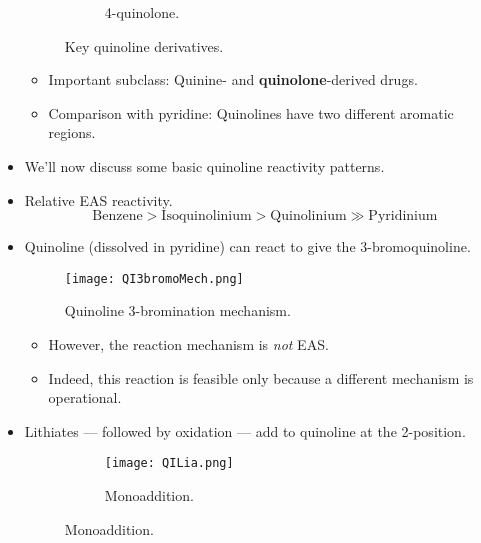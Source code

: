 \documentclass[../notes.tex]{subfiles}
\begin{document}
\begin{itemize}
\begin{figure}[h!]
\begin{subfigure}[b]{0.2\linewidth}
            \caption{4-quinolone.}
            \label{fig:quinolineDerivc}
        \end{subfigure}
        \caption{Key quinoline derivatives.}
        \label{fig:quinolineDeriv}
    \end{figure}
    \vspace{-0.3em}
    \begin{itemize}
        \item Important subclass: Quinine- and \textbf{quinolone}-derived drugs.
        \item Comparison with pyridine: Quinolines have two different aromatic regions.
    \end{itemize}
    \item We'll now discuss some basic quinoline reactivity patterns.
    \item Relative EAS reactivity.
    \begin{equation*}
        \text{Benzene}>\text{Isoquinolinium}>\text{Quinolinium}\gg\text{Pyridinium}
    \end{equation*}
    \vspace{-1.7em}
    \item Quinoline (dissolved in pyridine) can react to give the 3-bromoquinoline.
    \begin{figure}[H]
        \centering
        \texttt{[image: QI3bromoMech.png]}\\[-0.5em]
        \caption{Quinoline 3-bromination mechanism.}
        \label{fig:QI3bromoMech}
    \end{figure}
    \begin{itemize}
        \item However, the reaction mechanism is \emph{not} EAS.
        \item Indeed, this reaction is feasible only because a different mechanism is operational.
    \end{itemize}
    \item Lithiates --- followed by oxidation --- add to quinoline at the 2-position.
    \begin{figure}[h!]
        \centering
        \begin{subfigure}[b]{\linewidth}
            \centering
            \texttt{[image: QILia.png]}
            \caption{Monoaddition.}

\end{subfigure}
\end{figure}
\end{itemize}
\end{document}

